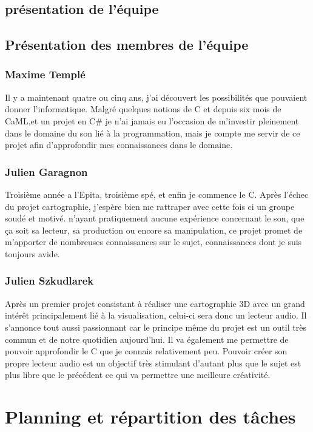 \documentclass[12pt]{report}
\begin{document}
\newpage

\section{présentation de l'équipe}
\section{Présentation des membres de l'équipe}
		\subsection{Maxime Templé}

Il y a maintenant quatre ou cinq ans, j'ai découvert les possibilités que pouvaient donner l'informatique. Malgré quelques notions de C et depuis six mois de CaML,et un projet en C\# je n'ai jamais eu l'occasion de m'investir pleinement dans le domaine du son lié à la programmation, mais je compte me servir de ce projet afin d'approfondir mes connaissances dans le domaine.

		\subsection{Julien Garagnon}

Troisième année a l'Epita, troisième spé, et enfin je commence le C. Après l'échec du projet cartographie, j'espère bien me rattraper avec cette fois ci un groupe soudé et motivé. n'ayant pratiquement aucune expérience concernant le son, que ça soit sa lecteur, sa production ou encore sa manipulation, ce projet promet de m'apporter de nombreuses connaissances sur le sujet, connaissances dont je suis toujours avide.

		\subsection{Julien Szkudlarek}
		Après un premier projet consistant à réaliser une cartographie 3D avec un grand intérêt principalement lié à la visualisation, celui-ci sera donc un lecteur audio. Il s'annonce tout aussi passionnant car le principe même du projet est un outil très commun et de notre quotidien aujourd'hui. Il va également me permettre de pouvoir approfondir le C que je connais relativement peu. Pouvoir créer son propre lecteur audio est un objectif très stimulant d'autant plus que le sujet est plus libre que le précédent ce qui va permettre une meilleure créativité.
\newpage


\chapter{Planning et répartition des tâches}
\end{document}
